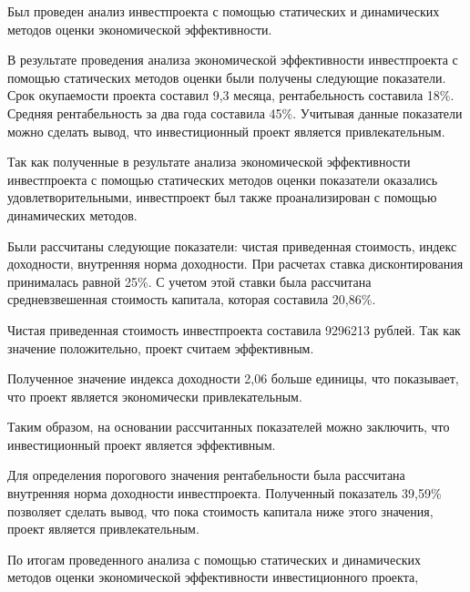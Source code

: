 Был проведен анализ инвестпроекта с помощью статических и динамических методов оценки экономической эффективности.

В результате проведения анализа экономической эффективности инвестпроекта с помощью статических методов оценки были получены следующие показатели. Срок окупаемости проекта составил 9,3 месяца, рентабельность составила 18\%. Средняя рентабельность за два года составила 45\%. Учитывая данные показатели можно сделать вывод, что инвестиционный проект является привлекательным.

Так как полученные в результате анализа экономической эффективности инвестпроекта с помощью статических методов оценки показатели оказались удовлетворительными, инвестпроект был также проанализирован с помощью динамических методов.

Были рассчитаны следующие показатели: чистая приведенная стоимость, индекс доходности, внутренняя норма доходности. При расчетах ставка дисконтирования принималась равной 25\%. С учетом этой ставки была рассчитана средневзвешенная стоимость капитала, которая составила 20,86\%.

Чистая приведенная стоимость инвестпроекта составила 9296213 рублей. Так как значение положительно, проект считаем эффективным.

Полученное значение индекса доходности 2,06 больше единицы, что показывает, что проект является экономически привлекательным.

Таким образом, на основании рассчитанных показателей можно заключить, что инвестиционный проект является эффективным.

Для определения порогового значения рентабельности была рассчитана внутренняя норма доходности инвестпроекта. Полученный показатель 39,59\% позволяет сделать вывод, что пока стоимость капитала ниже этого значения, проект является привлекательным.

По итогам проведенного анализа с помощью статических и динамических методов оценки экономической эффективности инвестиционного проекта, 




















